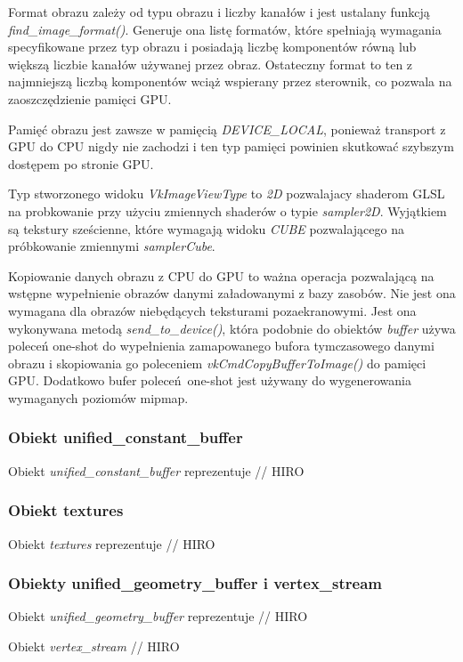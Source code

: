 Format obrazu zależy od typu obrazu i liczby kanałów i jest ustalany funkcją \textit{find\_image\_format()}.
Generuje ona listę formatów, które spełniają wymagania specyfikowane przez typ obrazu i posiadają liczbę komponentów równą lub większą liczbie kanałów używanej przez obraz.
Ostateczny format to ten z najmniejszą liczbą komponentów wciąż wspierany przez sterownik, co pozwala na zaoszczędzienie pamięci GPU.

Pamięć obrazu jest zawsze w pamięcią \textit{DEVICE\_LOCAL}, ponieważ transport z GPU do CPU nigdy nie zachodzi i ten typ pamięci powinien skutkować szybszym dostępem po stronie GPU.

Typ stworzonego widoku \textit{VkImageViewType} to \textit{2D} pozwalajacy shaderom GLSL na probkowanie przy użyciu zmiennych shaderów o typie \textit{sampler2D}. Wyjątkiem są tekstury sześcienne, które wymagają widoku \textit{CUBE} pozwalającego na próbkowanie zmiennymi \textit{samplerCube}.

Kopiowanie danych obrazu z CPU do GPU to ważna operacja pozwalającą na wstępne wypełnienie obrazów danymi załadowanymi z bazy zasobów. Nie jest ona wymagana dla obrazów niebędących teksturami pozaekranowymi.
Jest ona wykonywana metodą \textit{send\_to\_device()}, która podobnie do obiektów \textit{buffer} używa poleceń one-shot do wypełnienia zamapowanego bufora tymczasowego danymi obrazu i skopiowania go poleceniem \textit{vkCmdCopyBufferToImage()} do pamięci GPU.
Dodatkowo bufer poleceń one-shot jest używany do wygenerowania wymaganych poziomów mipmap.
 
\subsubsection{Obiekt unified\_constant\_buffer}
Obiekt \textit{unified\_constant\_buffer} reprezentuje 
// HIRO

\subsubsection{Obiekt textures}
Obiekt \textit{textures} reprezentuje 
// HIRO

\subsubsection{Obiekty unified\_geometry\_buffer i vertex\_stream}
Obiekt \textit{unified\_geometry\_buffer} reprezentuje 
// HIRO

Obiekt \textit{vertex\_stream} // HIRO
 
